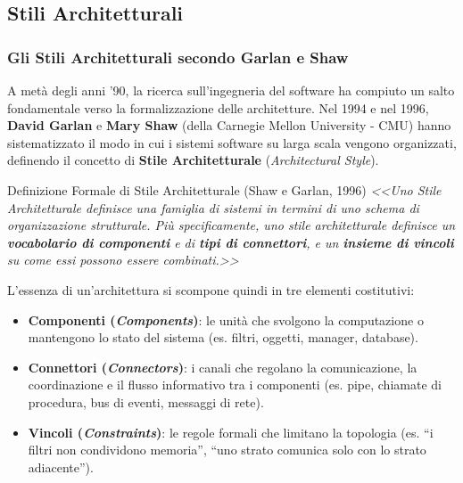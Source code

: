\documentclass[12pt]{extarticle}
\begin{document}
\subsection{Stili Architetturali}
\subsubsection{Gli Stili Architetturali secondo Garlan e Shaw}

\noindent A metà degli anni '90, la ricerca sull'ingegneria del software ha compiuto un salto fondamentale verso la formalizzazione delle architetture. Nel 1994 e nel 1996, \textbf{David Garlan} e \textbf{Mary Shaw} (della Carnegie Mellon University - CMU) hanno sistematizzato il modo in cui i sistemi software su larga scala vengono organizzati, definendo il concetto di \textbf{Stile Architetturale} (\textit{Architectural Style}).

\begin{cbox}{Definizione Formale di Stile Architetturale (Shaw e Garlan, 1996)}
\noindent \textit{<<Uno Stile Architetturale definisce una famiglia di sistemi in termini di uno schema di organizzazione strutturale. Più specificamente, uno stile architetturale definisce un \textbf{vocabolario di componenti} e di \textbf{tipi di connettori}, e un \textbf{insieme di vincoli} su come essi possono essere combinati.>>}
\end{cbox}

\noindent L'essenza di un'architettura si scompone quindi in tre elementi costitutivi:
\begin{itemize}
    \item \textbf{Componenti (\textit{Components})}: le unità che svolgono la computazione o mantengono lo stato del sistema (es. filtri, oggetti, manager, database).
    \item \textbf{Connettori (\textit{Connectors})}: i canali che regolano la comunicazione, la coordinazione e il flusso informativo tra i componenti (es. pipe, chiamate di procedura, bus di eventi, messaggi di rete).
    \item \textbf{Vincoli (\textit{Constraints})}: le regole formali che limitano la topologia (es. ``i filtri non condividono memoria'', ``uno strato comunica solo con lo strato adiacente'').
\end{itemize}
\end{document}
